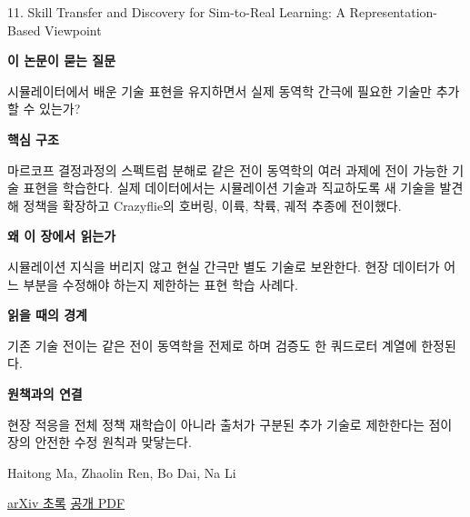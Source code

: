 \documentclass[11pt,openany]{book}
\begin{document}
\begin{termcard}{11. Skill Transfer and Discovery for Sim-to-Real Learning: A Representation-Based Viewpoint}

\par

\medskip

{\sffamily\bfseries\color{deepblue} 이 논문이 묻는 질문}\par

시뮬레이터에서 배운 기술 표현을 유지하면서 실제 동역학 간극에 필요한 기술만 추가할 수 있는가?

\smallskip

{\sffamily\bfseries\color{deepblue} 핵심 구조}\par

마르코프 결정과정의 스펙트럼 분해로 같은 전이 동역학의 여러 과제에 전이 가능한 기술 표현을 학습한다. 실제 데이터에서는 시뮬레이션 기술과 직교하도록 새 기술을 발견해 정책을 확장하고 Crazyflie의 호버링, 이륙, 착륙, 궤적 추종에 전이했다.

\smallskip

{\sffamily\bfseries\color{deepblue} 왜 이 장에서 읽는가}\par

시뮬레이션 지식을 버리지 않고 현실 간극만 별도 기술로 보완한다. 현장 데이터가 어느 부분을 수정해야 하는지 제한하는 표현 학습 사례다.

\smallskip

{\sffamily\bfseries\color{coral} 읽을 때의 경계}\par

기존 기술 전이는 같은 전이 동역학을 전제로 하며 검증도 한 쿼드로터 계열에 한정된다.

\smallskip

{\sffamily\bfseries\color{teal} 원책과의 연결}\par

현장 적응을 전체 정책 재학습이 아니라 출처가 구분된 추가 기술로 제한한다는 점이 장의 안전한 수정 원칙과 맞닿는다.

\medskip

{\footnotesize\color{muted} Haitong Ma, Zhaolin Ren, Bo Dai, Na Li\par

\href{https://arxiv.org/abs/2404.05051}{arXiv 초록} \quad \href{https://arxiv.org/pdf/2404.05051}{공개 PDF}\par}

\end{termcard}
\end{document}
